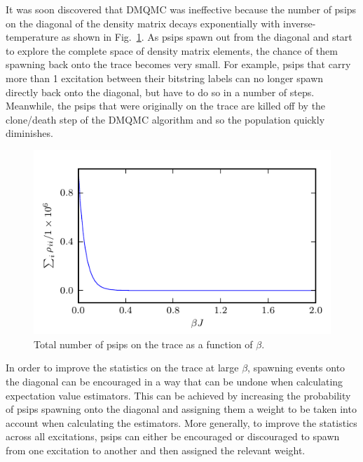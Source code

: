 It was soon discovered that DMQMC was ineffective because the number of psips on the diagonal of the density matrix decays exponentially with inverse-temperature as shown in Fig.~\ref{fig:6x6_no_importance_sampling2_trace}. As psips spawn out from the diagonal and start to explore the complete space of density matrix elements, the chance of them spawning back onto the trace becomes very small. For example, psips that carry more than 1 excitation between their bitstring labels can no longer spawn directly back onto the diagonal, but have to do so in a number of steps. Meanwhile, the psips that were originally on the trace are killed off by the clone/death step of the DMQMC algorithm and so the population quickly diminishes. 
\begin{figure}[H]
\begin{center}
\includegraphics[width =1\textwidth]{6x6_no_importance_sampling2_trace.pdf}
\caption[Total number of psips on the trace as a function of $\beta$.]{Total number of psips on the trace as a function of $\beta$.}
\label{fig:6x6_no_importance_sampling2_trace}
\end{center}
\end{figure}

In order to improve the statistics on the trace at large $\beta$, spawning events onto the diagonal can be encouraged in a way that can be undone when calculating expectation value estimators. This can be achieved by increasing the probability of psips spawning onto the diagonal and assigning them a weight to be taken into account when calculating the estimators. More generally, to improve the statistics across all excitations, psips can either be encouraged or discouraged to spawn from one excitation to another and then assigned the relevant weight.


